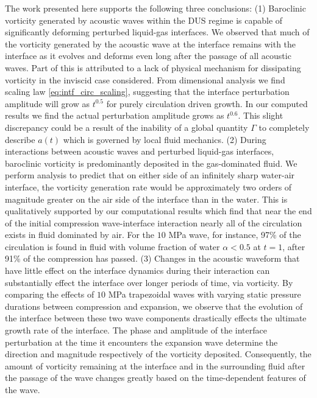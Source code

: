 The work presented here supports the following three conclusions:%
%
(1) Baroclinic vorticity generated by acoustic waves within the
\ac{DUS} regime is capable of significantly deforming perturbed
liquid-gas interfaces. We observed that much of the vorticity
generated by the acoustic wave at the interface remains with the
interface as it evolves and deforms even long after the passage of all
acoustic waves. Part of this is attributed to a lack of physical
mechanism for dissipating vorticity in the inviscid case
considered. From dimensional analysis we find scaling law
\eqref{eq:intf_circ_scaling}, suggesting that the interface
perturbation amplitude will grow as $t^{0.5}$ for purely circulation
driven growth. In our computed results we find the actual perturbation
amplitude grows as $t^{0.6}$. This slight discrepancy could be a
result of the inability of a global quantity $\Gamma$ to completely
describe $a(t)$ which is governed by local fluid mechanics.
%
(2) During interactions between acoustic waves and perturbed
liquid-gas interfaces, baroclinic vorticity is predominantly deposited
in the gas-dominated fluid. We perform analysis to predict that on either
side of an infinitely sharp water-air interface, the vorticity
generation rate would be approximately two orders of magnitude greater
on the air side of the interface than in the water. This is
qualitatively supported by our computational results which find that
near the end of the initial compression wave-interface interaction
nearly all of the circulation exists in fluid dominated by air. For
the $10$ MPa wave, for instance, 97\% of the circulation is found in
fluid with volume fraction of water $\alpha<0.5$ at $t=1$, after 91\%
of the compression has passed.
%
(3) Changes in the acoustic waveform that have little effect on the
interface dynamics during their interaction can substantially effect
the interface over longer periods of time, via vorticity. By comparing
the effects of $10$ MPa trapezoidal waves with varying static pressure
durations between compression and expansion, we observe that the
evolution of the interface between these two wave components
drastically effects the ultimate growth rate of the interface. The
phase and amplitude of the interface perturbation at the time it
encounters the expansion wave determine the direction and magnitude
respectively of the vorticity deposited. Consequently, the amount of
vorticity remaining at the interface and in the surrounding fluid
after the passage of the wave changes greatly based on the
time-dependent features of the wave.


